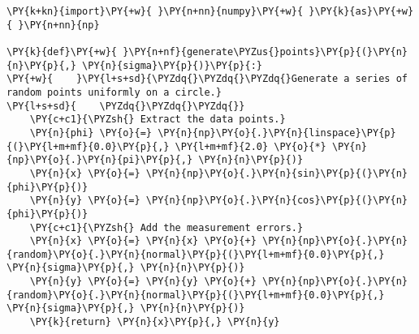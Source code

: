 \begin{Verbatim}[label=\makebox{\href{https://github.com/unipi-physics-labs/lab1-notes/tree/main/snippy/fit_circle.py}{https://github.com/.../fit\_circle.py}},commandchars=\\\{\}]
\PY{k+kn}{import}\PY{+w}{ }\PY{n+nn}{numpy}\PY{+w}{ }\PY{k}{as}\PY{+w}{ }\PY{n+nn}{np}

\PY{k}{def}\PY{+w}{ }\PY{n+nf}{generate\PYZus{}points}\PY{p}{(}\PY{n}{n}\PY{p}{,} \PY{n}{sigma}\PY{p}{)}\PY{p}{:}
\PY{+w}{    }\PY{l+s+sd}{\PYZdq{}\PYZdq{}\PYZdq{}Generate a series of random points uniformly on a circle.}
\PY{l+s+sd}{    \PYZdq{}\PYZdq{}\PYZdq{}}
    \PY{c+c1}{\PYZsh{} Extract the data points.}
    \PY{n}{phi} \PY{o}{=} \PY{n}{np}\PY{o}{.}\PY{n}{linspace}\PY{p}{(}\PY{l+m+mf}{0.0}\PY{p}{,} \PY{l+m+mf}{2.0} \PY{o}{*} \PY{n}{np}\PY{o}{.}\PY{n}{pi}\PY{p}{,} \PY{n}{n}\PY{p}{)}
    \PY{n}{x} \PY{o}{=} \PY{n}{np}\PY{o}{.}\PY{n}{sin}\PY{p}{(}\PY{n}{phi}\PY{p}{)}
    \PY{n}{y} \PY{o}{=} \PY{n}{np}\PY{o}{.}\PY{n}{cos}\PY{p}{(}\PY{n}{phi}\PY{p}{)}
    \PY{c+c1}{\PYZsh{} Add the measurement errors.}
    \PY{n}{x} \PY{o}{=} \PY{n}{x} \PY{o}{+} \PY{n}{np}\PY{o}{.}\PY{n}{random}\PY{o}{.}\PY{n}{normal}\PY{p}{(}\PY{l+m+mf}{0.0}\PY{p}{,} \PY{n}{sigma}\PY{p}{,} \PY{n}{n}\PY{p}{)}
    \PY{n}{y} \PY{o}{=} \PY{n}{y} \PY{o}{+} \PY{n}{np}\PY{o}{.}\PY{n}{random}\PY{o}{.}\PY{n}{normal}\PY{p}{(}\PY{l+m+mf}{0.0}\PY{p}{,} \PY{n}{sigma}\PY{p}{,} \PY{n}{n}\PY{p}{)}
    \PY{k}{return} \PY{n}{x}\PY{p}{,} \PY{n}{y}


\end{Verbatim}
